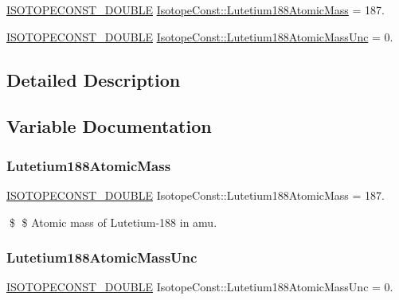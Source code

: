 \begin{DoxyCompactItemize}
\item 
\mbox{\hyperlink{group___isotope_const-_macros_ga8f45a7272ce02c0b4c65c44636ed719a}{I\+S\+O\+T\+O\+P\+E\+C\+O\+N\+S\+T\+\_\+\+D\+O\+U\+B\+LE}} \mbox{\hyperlink{group___isotope_const-_lutetium-_lu188_ga87c55994791f96139a8f7d794e9a1655}{Isotope\+Const\+::\+Lutetium188\+Atomic\+Mass}} = 187.
\item 
\mbox{\hyperlink{group___isotope_const-_macros_ga8f45a7272ce02c0b4c65c44636ed719a}{I\+S\+O\+T\+O\+P\+E\+C\+O\+N\+S\+T\+\_\+\+D\+O\+U\+B\+LE}} \mbox{\hyperlink{group___isotope_const-_lutetium-_lu188_ga5bb5faf0be98b9d51698306023cfd4ff}{Isotope\+Const\+::\+Lutetium188\+Atomic\+Mass\+Unc}} = 0.
\end{DoxyCompactItemize}


\subsection{Detailed Description}


\subsection{Variable Documentation}
\mbox{\label{group___isotope_const-_lutetium-_lu188_ga87c55994791f96139a8f7d794e9a1655}} 
\subsubsection{\texorpdfstring{Lutetium188\+Atomic\+Mass}{Lutetium188AtomicMass}}
{\footnotesize\ttfamily \mbox{\hyperlink{group___isotope_const-_macros_ga8f45a7272ce02c0b4c65c44636ed719a}{I\+S\+O\+T\+O\+P\+E\+C\+O\+N\+S\+T\+\_\+\+D\+O\+U\+B\+LE}} Isotope\+Const\+::\+Lutetium188\+Atomic\+Mass = 187.}

\$ \$ Atomic mass of Lutetium-\/188 in amu. \mbox{\label{group___isotope_const-_lutetium-_lu188_ga5bb5faf0be98b9d51698306023cfd4ff}} 
\subsubsection{\texorpdfstring{Lutetium188\+Atomic\+Mass\+Unc}{Lutetium188AtomicMassUnc}}
{\footnotesize\ttfamily \mbox{\hyperlink{group___isotope_const-_macros_ga8f45a7272ce02c0b4c65c44636ed719a}{I\+S\+O\+T\+O\+P\+E\+C\+O\+N\+S\+T\+\_\+\+D\+O\+U\+B\+LE}} Isotope\+Const\+::\+Lutetium188\+Atomic\+Mass\+Unc = 0.}

